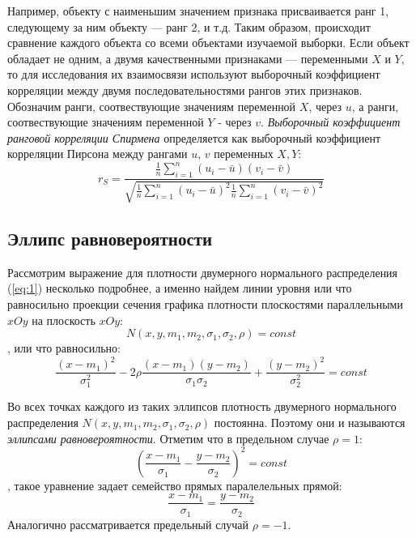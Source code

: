 \documentclass[12pt,a4paper]{article}
\begin{document}
Например, объекту с наименьшим значением признака присваивается ранг 1, следующему за ним объекту — ранг 2, и т.д. Таким образом, происходит сравнение каждого объекта со всеми объектами изучаемой выборки. Если объект обладает не одним, а двумя качественными признаками — переменными $X$ и $Y$, то для исследования их взаимосвязи используют выборочный коэффициент корреляции между двумя последовательностями рангов этих признаков. \\

Обозначим ранги, соотвествующие значениям переменной $X$, через $u$, а ранги, соотвествующие значениям переменной $Y$ - через $v$. \textit{Выборочный коэффициент ранговой корреляции Спирмена} определяется как выборочный коэффициент корреляции Пирсона между рангами $u$, $v$ переменных $X, Y$:
\begin{equation}\label{eq:8}
	r_S = \frac
			{\frac{1}{n} \sum_{i=1}^{n}{(u_i - \bar{u})(v_i - \bar{v})}}
			{\sqrt{\frac{1}{n} \sum_{i=1}^{n}{(u_i-\bar{u})^2}
					\frac{1}{n} \sum_{i=1}^{n}{(v_i-\bar{v})^2}}}
\end{equation}

\subsection{Эллипс равновероятности}
Рассмотрим выражение для плотности двумерного нормального распределения (\ref{eq:1}) несколько подробнее, а именно найдем линии уровня или что равносильно проекции сечения графика плотности плоскостями параллельными $xOy$ на плоскость $xOy$:
$$N(x, y, m_1, m_2, \sigma_1, \sigma_2, \rho) = const$$
, или что равносильно:
\begin{equation}\label{eq:9}
	\frac{(x - m_1)^2}{\sigma_1^2} - 2\rho\frac{(x - m_1)(y - m_2)}{\sigma_1\sigma_2} + \frac{(y - m_2)^2}{\sigma_2^2} = const
\end{equation}

Во всех точках каждого из таких эллипсов плотность двумерного нормального распределения $N(x, y, m_1, m_2, \sigma_1, \sigma_2, \rho)$ постоянна. Поэтому они и называются \textit{эллипсами равновероятности}\cite[стр. 44-45]{ventzel}. Отметим что в предельном случае $\rho = 1$:
$$\left(\frac{x-m_1}{\sigma_1} - \frac{y-m_2}{\sigma_2}\right)^2 = const$$
, такое уравнение задает семейство прямых паралелельных прямой:
\begin{equation}\label{eq:10}
	\frac{x-m_1}{\sigma_1} = \frac{y-m_2}{\sigma_2}
\end{equation}
Аналогично рассматривается предельный случай $\rho = -1$.
\end{document}
